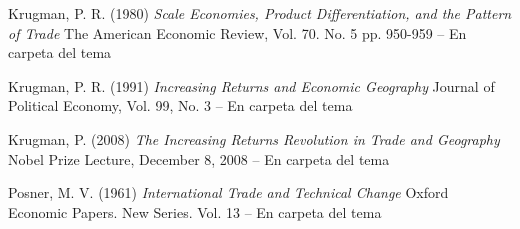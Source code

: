 \documentclass{nuevotema}
\begin{document}
Krugman, P. R. (1980) \textit{Scale Economies, Product Differentiation, and the Pattern of Trade} The American Economic Review, Vol. 70. No. 5 pp. 950-959 -- En carpeta del tema

Krugman, P. R. (1991) \textit{Increasing Returns and Economic Geography} Journal of Political Economy, Vol. 99, No. 3 -- En carpeta del tema

Krugman, P. (2008) \textit{The Increasing Returns Revolution in Trade and Geography} Nobel Prize Lecture, December 8, 2008 -- En carpeta del tema

Posner, M. V. (1961) \textit{International Trade and Technical Change} Oxford Economic Papers. New Series. Vol. 13 -- En carpeta del tema
\end{document}
